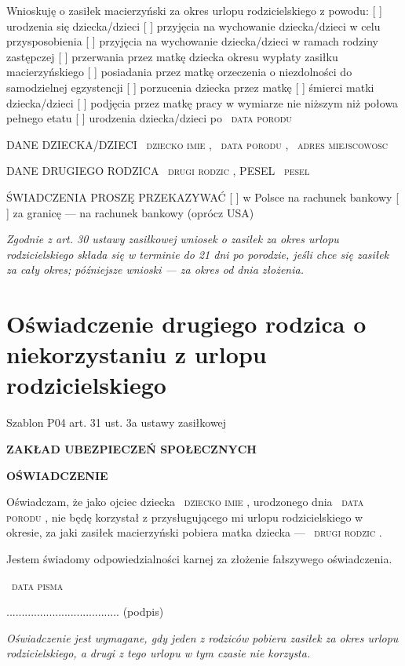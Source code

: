 \documentclass[11pt,a4paper]{article}
\newcommand{\Pole}[1]{%
  \textcolor{szary}{\dotfill}\,%
  {\scriptsize\textcolor{szary}{\textsc{#1}}}%
}
\newcommand{\NaglowekPisma}[1]{%
  \par\vspace{0.8em}%
  \begin{center}%
    {\large\bfseries\MakeUppercase{#1}}%
  \end{center}%
  \vspace{0.4em}%
}
\begin{document}
Wnioskuję o zasiłek macierzyński za okres urlopu rodzicielskiego z powodu:
[ ] urodzenia się dziecka/dzieci
[ ] przyjęcia na wychowanie dziecka/dzieci w celu przysposobienia
[ ] przyjęcia na wychowanie dziecka/dzieci w ramach rodziny zastępczej
[ ] przerwania przez matkę dziecka okresu wypłaty zasiłku macierzyńskiego
[ ] posiadania przez matkę orzeczenia o niezdolności do samodzielnej egzystencji
[ ] porzucenia dziecka przez matkę
[ ] śmierci matki dziecka/dzieci
[ ] podjęcia przez matkę pracy w wymiarze nie niższym niż połowa pełnego etatu
[ ] urodzenia dziecka/dzieci po \Pole{data porodu}

DANE DZIECKA/DZIECI
\Pole{dziecko imie}, \Pole{data porodu}, \Pole{adres miejscowosc}

DANE DRUGIEGO RODZICA
\Pole{drugi rodzic}, PESEL \Pole{pesel}

ŚWIADCZENIA PROSZĘ PRZEKAZYWAĆ
[ ] w Polsce na rachunek bankowy
[ ] za granicę --- na rachunek bankowy (oprócz USA)

\vfill
{\footnotesize\color{szary}\itshape Zgodnie z art. 30 ustawy zasiłkowej wniosek o zasiłek za okres urlopu rodzicielskiego składa się w terminie do 21 dni po porodzie, jeśli chce się zasiłek za cały okres; późniejsze wnioski --- za okres od dnia złożenia. }

\clearpage

\section{Oświadczenie drugiego rodzica o niekorzystaniu z urlopu rodzicielskiego}

{\small\color{szary}Szablon P04 \textbullet{} art. 31 ust. 3a ustawy zasiłkowej}

\NaglowekPisma{ZAKŁAD UBEZPIECZEŃ SPOŁECZNYCH}

\NaglowekPisma{OŚWIADCZENIE}

Oświadczam, że jako ojciec dziecka \Pole{dziecko imie}, urodzonego dnia
\Pole{data porodu}, nie będę korzystał z przysługującego mi urlopu
rodzicielskiego w okresie, za jaki zasiłek macierzyński pobiera matka
dziecka --- \Pole{drugi rodzic}.

Jestem świadomy odpowiedzialności karnej za złożenie fałszywego oświadczenia.

\Pole{data pisma}
.....................................
(podpis)

\vfill
{\footnotesize\color{szary}\itshape Oświadczenie jest wymagane, gdy jeden z rodziców pobiera zasiłek za okres urlopu rodzicielskiego, a drugi z tego urlopu w tym czasie nie korzysta. }
\end{document}
